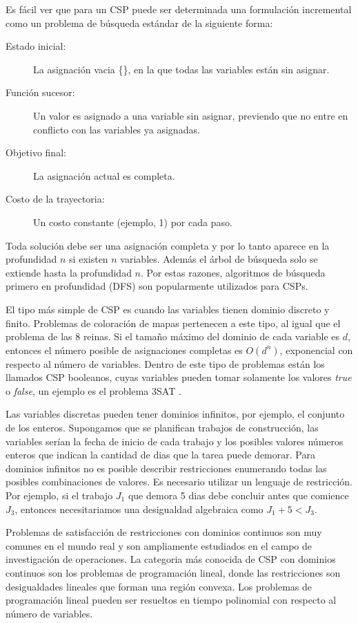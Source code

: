 Es f\'acil ver que para un CSP puede ser determinada una formulaci\'on incremental como un problema de búsqueda est\'andar de la siguiente forma:

\begin{description}
	\item[Estado inicial:] La asignaci\'on vacia \{\}, en la que todas las variables est\'an sin asignar.
	\item[Funci\'on sucesor:] Un valor es asignado a una variable sin asignar, previendo que no entre en conflicto con las variables ya asignadas.
	\item[Objetivo final:] La asignaci\'on actual es completa.
	\item[Costo de la trayectoria:] Un costo constante (ejemplo, 1) por cada paso.
\end{description}

Toda soluci\'on debe ser una asignaci\'on completa y por lo tanto aparece en la profundidad $n$ si existen $n$ variables. Adem\'as el \'arbol de búsqueda solo se extiende hasta la profundidad $n$. Por estas razones, algoritmos de b\'usqueda primero en profundidad (DFS) son popularmente utilizados para CSPs.

El tipo m\'as simple de CSP es cuando las variables tienen dominio discreto y finito. Problemas de coloraci\'on de mapas pertenecen a este tipo, al igual que el problema de las 8 reinas. Si el tamaño m\'aximo del dominio de cada variable es $d$, entonces el n\'umero posible de asignaciones completas es $O(d^{n})$, exponencial con respecto al n\'umero de variables. Dentro de este tipo de problemas est\'an los llamados CSP booleanos, cuyas variables pueden tomar solamente los valores \emph{true} o \emph{false}, un ejemplo es el problema 3SAT \cite{Carla P. Gomes}.

Las variables discretas pueden tener dominios infinitos, por ejemplo, el conjunto de los enteros. Supongamos que se planifican trabajos de construcci\'on, las variables ser\'ian la fecha de inicio de cada trabajo y los posibles valores n\'umeros enteros que indican la cantidad de dias que la tarea puede demorar. Para dominios infinitos no es posible describir restricciones enumerando todas las posibles combinaciones de valores. Es necesario utilizar un lenguaje de restricci\'on. Por ejemplo, si el trabajo $J_{1}$ que demora 5 dias debe concluir antes que comience $J_{3}$, entonces necesitariamos una desigualdad algebraica como $J_{1} + 5 < J_{3}$.

Problemas de satisfacci\'on de restricciones con dominios continuos son muy comunes en el mundo real y son ampliamente estudiados en el campo de investigaci\'on de operaciones. La categoria m\'as conocida de CSP con dominios continuos son los problemas de programaci\'on lineal, donde las restricciones son desigualdades lineales que forman una regi\'on convexa. Los problemas de programaci\'on lineal pueden ser resueltos en tiempo polinomial con respecto al n\'umero de variables.

